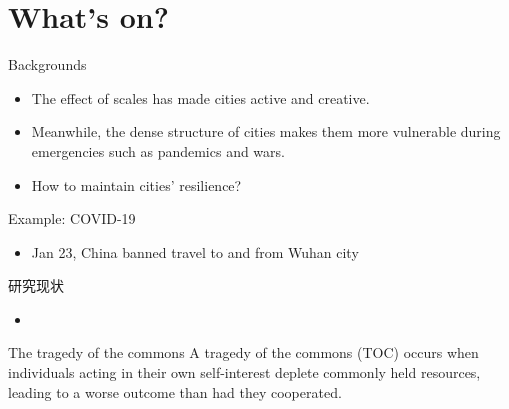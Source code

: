 \section{What's on?}

\begin{frame}{Backgrounds}
    \begin{itemize}
        \item The effect of scales has made cities active and creative.
        \item Meanwhile, the dense structure of cities makes them more vulnerable during emergencies such as pandemics and wars.
        \item How to maintain cities' resilience?
    \end{itemize}
\end{frame}

\begin{frame}{Example: COVID-19}
    \begin{itemize}
        \item Jan 23, China banned travel to and from Wuhan city
        
    \end{itemize}

\end{frame}

\begin{frame}{研究现状}
    \begin{itemize}
        \item 
    \end{itemize}
\end{frame}

\begin{frame}{The tragedy of the commons}
    A tragedy of the commons (TOC) occurs when individuals acting in their own self-interest deplete commonly held resources, leading to a worse outcome than had they cooperated.
\end{frame}